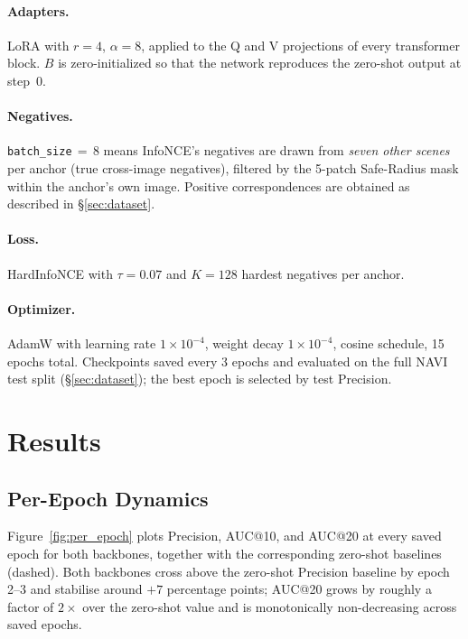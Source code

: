 \documentclass[11pt,a4paper]{article}
\begin{document}
\paragraph{Adapters.} LoRA with $r = 4$, $\alpha = 8$, applied to the Q and V projections of every
transformer block. $B$ is zero-initialized so that the network reproduces the zero-shot output at
step~0.

\paragraph{Negatives.} \texttt{batch\_size}\,$=$\,8 means InfoNCE's negatives are drawn from
\emph{seven other scenes} per anchor (true cross-image negatives), filtered by the 5-patch Safe-Radius
mask within the anchor's own image. Positive correspondences are obtained as described in
\S\ref{sec:dataset}.

\paragraph{Loss.} HardInfoNCE with $\tau = 0.07$ and $K = 128$ hardest negatives per anchor.

\paragraph{Optimizer.} AdamW with learning rate $1\!\times\!10^{-4}$, weight decay $1\!\times\!10^{-4}$,
cosine schedule, 15 epochs total. Checkpoints saved every 3 epochs and evaluated on the full NAVI
test split (\S\ref{sec:dataset}); the best epoch is selected by test Precision.

\section{Results}
\label{sec:results}

\subsection{Per-Epoch Dynamics}

Figure~\ref{fig:per_epoch} plots Precision, AUC@10, and AUC@20 at every saved epoch for both backbones,
together with the corresponding zero-shot baselines (dashed). Both backbones cross above the zero-shot
Precision baseline by epoch 2--3 and stabilise around $+7$ percentage points; AUC@20 grows by roughly a
factor of $2\!\times\!$ over the zero-shot value and is monotonically non-decreasing across saved
epochs.
\end{document}
